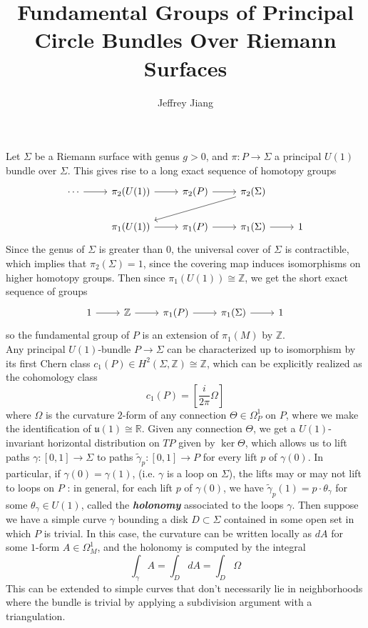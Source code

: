 \documentclass[psamsfonts, 12pt]{amsart}
\theoremstyle{definition}
\theoremstyle{remark}
\newcommand{\R}{\mathbb{R}}
\newcommand{\ib}[1]{\textbf{\textit{#1}}}
\newcommand{\Z}{\mathbb{Z}}
\begin{document}
%
\author{Jeffrey Jiang}
%
\title{Fundamental Groups of Principal Circle Bundles Over Riemann Surfaces}
%
\maketitle
%
Let $\Sigma$ be a Riemann surface with genus $g > 0$, and $\pi : P \to \Sigma$
a principal $U(1)$ bundle over $\Sigma$. This gives rise to a long exact sequence
of homotopy groups
\[\begin{tikzcd}
\cdots \ar[r] & \pi_2(U(1)) \ar[r] & \pi_2(P) \ar[r] & \pi_2(\Sigma) \ar[dll]\\
& \pi_1(U(1)) \ar[r] & \pi_1(P) \ar[r] & \pi_1(\Sigma) \ar[r] & 1
\end{tikzcd}\]
Since the genus of $\Sigma$ is greater than $0$, the universal cover of $\Sigma$
is contractible, which implies that $\pi_2(\Sigma) = 1$, since the covering map
induces isomorphisms on higher homotopy groups. Then since $\pi_1(U(1)) \cong \Z$,
we get the short exact sequence of groups
\[\begin{tikzcd}
1 \ar[r] & \Z \ar[r] & \pi_1(P) \ar[r] & \pi_1(\Sigma) \ar[r] & 1
\end{tikzcd}\]
so the fundamental group of $P$ is an extension of $\pi_1(M)$ by $\Z$. \\

Any principal $U(1)$-bundle $P \to \Sigma$ can be characterized up to isomorphism by
its first Chern class $c_1(P) \in H^2(\Sigma,\Z) \cong \Z$, which can be explicitly realized
as the cohomology class
\[
c_1(P) = \left[\frac{i}{2\pi}\Omega\right]
\]
where $\Omega$ is the curvature $2$-form of any connection $\Theta \in \Omega^1_P$ on $P$,
where we make the identification of $\mathfrak{u}(1) \cong \R$. Given any connection
$\Theta$, we get a $U(1)$-invariant horizontal distribution on $TP$ given by
$\ker\Theta$, which allows us to lift paths $\gamma : [0,1] \to \Sigma$ to paths
$\widetilde{\gamma}_p : [0,1] \to P$ for every lift $p$ of $\gamma(0)$. In particular, if
$\gamma(0) = \gamma(1)$, (i.e. $\gamma$ is a  loop on $\Sigma$), the lifts may or may not
lift to loops on $P$ : in general, for each lift $p$ of $\gamma(0)$, we have
$\widetilde{\gamma}_p(1) = p\cdot \theta_\gamma$ for some $\theta_\gamma \in U(1)$,
called the \ib{holonomy} associated to the loops $\gamma$. Then suppose we have a
simple curve $\gamma$ bounding a disk $D \subset \Sigma$ contained
in some open set in which $P$ is trivial. In this case, the curvature can
be written locally as $dA$ for some $1$-form $A \in \Omega^1_M$, and the holonomy
is computed by the integral
\[
\int_\gamma A = \int_D dA = \int_D \Omega
\]
This can be extended to simple curves that don't necessarily lie in neighborhoods
where the bundle is trivial by applying a subdivision argument with a triangulation. \\
\end{document}
